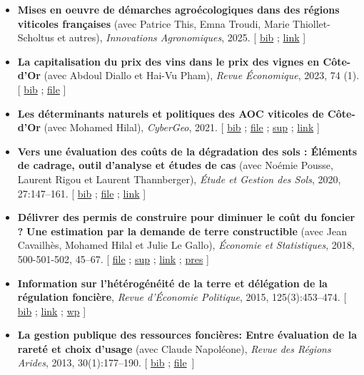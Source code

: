 \documentclass[12pt, a4paper]{./style}
\begin{document}
\begin{itemize}
\item \textbf{Mises en oeuvre de démarches agroécologiques dans des
régions viticoles françaises} (avec Patrice This, Emna
Troudi, Marie Thiollet-Scholtus et autres),
\emph{Innovations Agronomiques}, 2025. [ \href{bib/IA25.bib}{bib} ; \href{https://hal.inrae.fr/hal-05010342v1/document}{link} ]
\item \textbf{La capitalisation du prix des vins dans le prix des
vignes en Côte-d’Or} (avec Abdoul Diallo et Hai-Vu
Pham), \emph{Revue Économique}, 2023, 74 (1). [ \href{bib/VINPX.bib}{bib} ; \href{doc/VINPX-FILE.pdf}{file} ]
\item \textbf{Les déterminants naturels et politiques des AOC
viticoles de Côte-d’Or} (avec Mohamed Hilal),
\emph{CyberGeo}, 2021. [ \href{bib/DNPA.bib}{bib} ; \href{doc/DNPA-FILE.pdf}{file} ; \href{doc/DNPA-SUP.pdf}{sup} ; \href{https://journals.openedition.org/cybergeo/36443}{link} ]
\item \textbf{Vers une évaluation des coûts de la dégradation des
sols : Éléments} \textbf{de cadrage, outil d'analyse et études
de cas} (avec Noémie Pousse, Laurent Rigou et Laurent
Thannberger), \emph{Étude et Gestion des Sols}, 2020,
27:147--161. [ \href{bib/ESOL.bib}{bib} ; \href{doc/ECOSOL-FILE.pdf}{file} ; \href{https://www.afes.fr/ressources/numero-special-egs-fonctions-des-sols-et-services-ecosystemiques/}{link} ]
\item \textbf{Délivrer des permis de construire pour diminuer le
coût du foncier ?} \textbf{Une estimation par la demande de
terre constructible} (avec Jean Cavailhès, Mohamed
Hilal et Julie Le Gallo), \emph{Économie et Statistiques},
2018, 500-501-502, 45--67. [ \href{doc/PCPXf-FILE.pdf}{file} ; \href{doc/PCPX-SUP.pdf}{sup} ; \href{https://insee.fr/fr/statistiques/3621977?sommaire=3622116}{link} ; \href{doc/PCPXf-PRES.pdf}{pres} ]
\item \textbf{Information sur l'hétérogénéité de la terre et
délégation de la régulation foncière}, \emph{Revue
d'Économie Politique}, 2015, 125(3):453--474. [ \href{bib/IFHT.bib}{bib} ;
\href{https://www.cairn.info/revue-d-economie-politique-2015-3-page-453.htm}{link} ; \href{http://ideas.repec.org/p/ceo/wpaper/32.html}{wp} ]
\item \textbf{La gestion publique des ressources foncières: Entre
évaluation de la rareté et choix d'usage} (avec Claude
Napoléone), \emph{Revue des Régions Arides}, 2013,
30(1):177--190. [ \href{bib/GPRF.bib}{bib} ; \href{https://www.researchgate.net/profile/Claude\_Napoleone/publication/268075060\_La\_gestion\_publique\_des\_ressources\_foncieres\_entre\_evaluation\_de\_la\_rarete\_et\_choix\_d'usages/links/5460bdd20cf295b5616376de/La-gestion-publique-des-ressources-foncieres-entre-evaluation-de-la-rarete-et-choix-dusages.pdf}{file}~]
\end{itemize}
\label{sec:orgdd67557}
\end{document}
